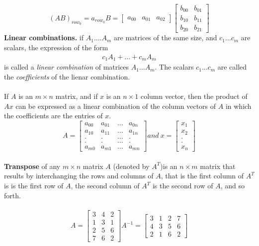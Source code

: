 \documentclass[a4paper, 12pt]{article}
\begin{document}
\[
(AB)_{row_0} = a_{row_0}B  = 
\left[
{
    \begin{array}{ccc}
    a_{00} &  a_{01} &  a_{02}
    \end{array}
}
\right]
\left[
{
    \begin{array}{cc}
        b_{00} &  b_{01} \\
        b_{10} &  b_{11} \\
        b_{20} &  b_{21} 
    \end{array}
}
\right]
\]
\textbf{Linear combinations.}
if $A_1....A_m$ are matrices of the same size, and $c_1...c_m$ are scalars, the expression
of the form
\begin{align*}
c_1A_1+...+c_mA_m
\end{align*}
is called a \textit{linear combination} of matrices $A_1...A_m$. The scalars $c_1...c_m$
 are called the \textit{coefficients} of the lienar combination.
\\
\\
If $A$ is an $m \times n$ matrix, and if $x$ is an $n \times 1$ column vector, 
then the product of $Ax$ can be expressed as a linear combination of the column vectors
of $A$ in which the coefficients are the entries of $x$.
\[
A = \left[{
    \begin{array}{cccc}
    a_{00} & a_{01} & ... & a_{0n} \\
    a_{10} & a_{11} & ... & a_{1n} \\
    .      & .      & ... & .      \\
    .      & .      & ... & .      \\
    a_{m0} & a_{m1} & ... & a_{mn} 
    \end{array}
}
\right]
and\ x = \left[{
    \begin{array}{c}
    x_1 \\
    x_2 \\
    . \\
    . \\
    x_n 
    \end{array}
}
\right]
\] 
\\ 
\textbf{Transpose} of any $m \times n$ matrix $A$ (denoted by $A^T$)is an $n \times m$ matrix that
results by interchanging the rows and columns of $A$, that is the first column of $A^T$ is is the first row
of $A$, the second column of $A^T$ is the second row of $A$, and so forth.
\\
\\ 
\[
A = 
\left[{
\begin{array}{ccc}
3 & 4 & 2 \\
1 & 3 & 1 \\
2 & 5 & 6 \\
7 & 6 & 2
\end{array}
} \right]
A^{-1} =
\left[{
\begin{array}{cccc}
3 & 1 & 2 & 7 \\
4 & 3 & 5 & 6 \\
2 & 1 & 6 & 2
\end{array}
}\right]
\]
\end{document}
